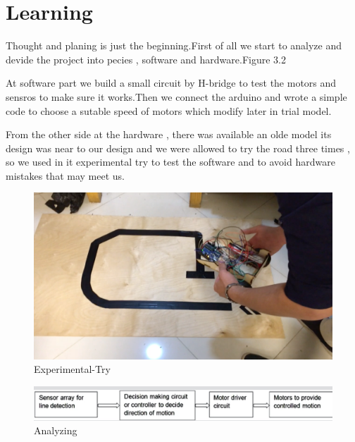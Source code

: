 \documentclass[11pt]{report}
\begin{document}
	
	\newpage
	\chapter{Learning} 
	Thought and planing is just the beginning.First of all we start to analyze and devide the project into pecies , software and hardware.Figure 3.2
	
	At software part we build a small circuit by H-bridge to test the motors and sensros to make sure it works.Then we connect the arduino and wrote a simple code to choose a sutable speed of motors which modify later in trial model.
	
	From the other side at the hardware , there was available an olde model its design was near to our design and we were allowed to try the road three times , so we used in it experimental try to test the software and to avoid hardware mistakes that may meet us.
	\begin{figure}[h]
					\begin{center}
						\includegraphics[scale=0.1]{Ch2-Planning/Experimental-Try}
						\caption{Experimental-Try}
					\end{center}
	\end{figure}
	
	\begin{figure}[b]
					\begin{center}
						\includegraphics[scale=0.2]{Ch2-Planning/Block-Diag}
						\caption{Analyzing}
					\end{center}
	\end{figure}
	
\end{document}
